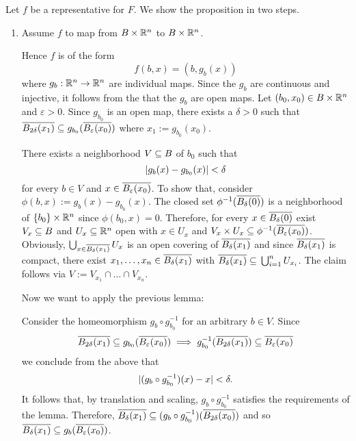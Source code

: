 \begin{myproof}
    Let $f$ be a representative for $F$.
    We show the proposition in two steps.
    \begin{enumerate}
        \item Assume $f$ to map from $B \times \mathbb{R}^n$ to $B \times \mathbb{R}^n$.
        
        Hence $f$ is of the form
        \[ f(b, x) = (b, g_b(x)) \]
        where $g_b: \mathbb{R}^n \to \mathbb{R}^n$ are individual maps.
        Since the $g_b$ are continuous and injective, it follows from the  that the $g_b$ are open maps.
        Let $(b_0, x_0) \in B \times \mathbb{R}^n$ and $\varepsilon > 0$.
        Since $g_{b_0}$ is an open map, there exists a $\delta > 0$ such that
        $\clball[2\delta][x_1] \sub g_{b_0}(\clball[\varepsilon][x_0])$ where $x_1 := g_{b_0}(x_0)$.

        There exists a neighborhood $V \subseteq{} B$ of $b_0$ such that
        \[ \vert{} g_b(x) - g_{b_0}(x) \vert{} < \delta \]
        for every $b \in V$ and $x \in \clball[\varepsilon][x_0]$.
        To show that, consider $\phi(b, x) := g_b(x) - g_{b_0}(x)$.
        The closed set $\phi^{-1}(\clball[\delta])$ is a neighborhood of $\{b_0\} \times \mathbb{R}^n$ since $\phi(b_0, x) = 0$.
        Therefore, for every $x \in \clball[\delta]$ exist $V_x \subseteq{} B$ and $U_x \subseteq{} \mathbb{R}^n$ open with $x \in U_x$ and $V_x \times U_x \sub \phi^{-1}(\clball[\varepsilon][x_0])$.
        Obviously, $\bigcup_{x \in \clball[\delta][x_1]} U_x$ is an open covering of $\clball[\delta][x_1]$ and since $\clball[\delta][x_1]$ is compact,
        there exist $x_1, \dots, x_n \in \clball[\delta][x_1]$ with $\clball[\delta][x_1] \sub \bigcup_{i = 1}^{n} U_{x_i}$.
        The claim follows via $V := V_{x_1} \cap \dots \cap V_{x_n}$.

        Now we want to apply the previous lemma:

        Consider the homeomorphism $g_b \circ g_{b_0}^{-1}$ for an arbitrary $b \in V$.
        Since
        \[ \clball[2\delta][x_1] \sub g_{b_0}(\clball[\varepsilon][x_0]) \implies g_{b_0}^{-1}(\clball[2\delta][x_1]) \sub \clball[\varepsilon][x_0] \]
        we conclude from the above that
        \[ \vert{} (g_b \circ g_{b_0}^{-1})(x) - x \vert{} < \delta. \]
        It follows that, by translation and scaling, $g_b \circ g_{b_0}^{-1}$ satisfies the requirements of the lemma.
        Therefore, $\clball[\delta][x_1] \sub (g_b \circ g_{b_0}^{-1})(\clball[2\delta][x_0])$ and so $\clball[\delta][x_1] \sub g_b(\clball[\varepsilon][x_0])$.


\end{enumerate}
\end{myproof}

